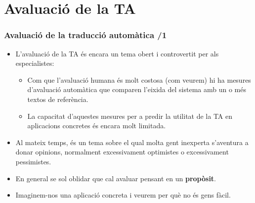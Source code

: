 \documentclass{beamer}
\begin{document}


\section{Avaluació de la TA}

\begin{frame}
  \frametitle{Avaluació de la traducció automàtica /1}

  \begin{itemize}
  \item   L'avaluació de la TA és encara un tema obert i controvertit per als
  especialistes:
  \begin{itemize}
  \item Com que l'avaluació humana és molt costosa (com veurem) hi ha
     mesures d'avaluació automàtica que comparen l'eixida
    del sistema amb un o més textos de referència.
  \item La capacitat d'aquestes mesures per a predir la utilitat de la
    TA en aplicacions concretes és encara molt limitada.
  \end{itemize}
  \item   Al mateix temps, és un tema sobre el qual molta gent inexperta
  s'aventura a donar opinions, normalment excessivament optimistes o
  excessivament pessimistes.
  \item   En general se sol oblidar que cal avaluar pensant en un \textbf{propòsit}.
  \item   Imaginem-nos una aplicació concreta i veurem per què no és gens fàcil.
  \end{itemize}






\end{frame}
\end{document}
